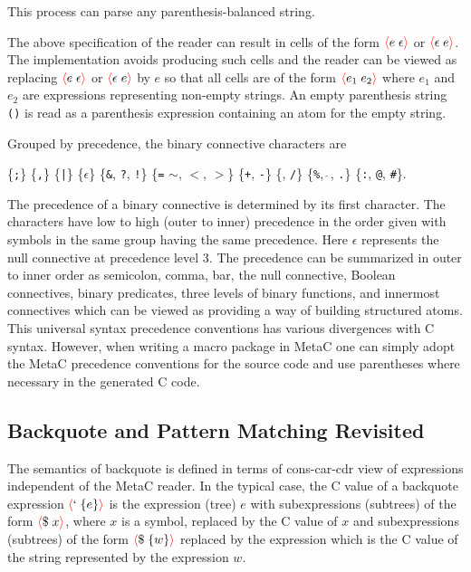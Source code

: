 \documentclass{article}
\newcommand{\mtt}[1]{\mbox{\tt #1}}
\newcommand{\fopen}{{\color{red} \langle}}
\newcommand{\fclose}{{\color{red} \rangle}}
\begin{document}
\noindent This process can parse any parenthesis-balanced string.

The above specification of the reader can result in cells of the form $\fopen e\;\epsilon \fclose$ or $\fopen \epsilon \;e\fclose$.   The implementation avoids producing such cells
and the reader can be viewed as replacing $\fopen e\;\epsilon \fclose$ or $\fopen \epsilon \;e\fclose$ by $e$ so that
all cells are of the form $\fopen e_1\;e_2\fclose$ where $e_1$ and $e_2$ are expressions representing non-empty strings.  An empty parenthesis string {\tt ()}
is read as a parenthesis expression containing an atom for the empty string.

\noindent Grouped by precedence, the binary connective characters are

\medskip
\centerline{\{\mtt{;}\} \{\mtt{,}\}  \{\mtt{|}\} \{$\epsilon$\}
  \{{\tt \&}, {\tt ?}, {\tt !}\} \{{\tt =} {\tt $\sim$}, {\tt $<$}, {\tt $>$}\} \{{\tt +}, {\tt -}\}
  \{{\tt *}, {\tt /}\} \{{\tt \%}, $\hat{~}$, {\tt .}\} \{\mtt{:},  {\tt @}, {\tt \#}\}.}

\noindent The precedence of a binary connective is determined by its first character.  The
characters have low to high (outer to inner) precedence in the order given with symbols in the same
group having the same precedence.  Here $\epsilon$ represents the null connective at precedence
level 3.  The precedence can be summarized in outer to inner order as semicolon, comma, bar, the
null connective, Boolean connectives, binary predicates, three levels of binary functions, and
innermost connectives which can be viewed as providing a way of building structured atoms.  This
universal syntax precedence conventions has
various divergences with C syntax.  However, when writing a macro package in MetaC one can simply
adopt the MetaC precedence conventions for the source code and use parentheses where necessary in
the generated C code.

\subsection{Backquote and Pattern Matching Revisited}

The semantics of backquote is defined in terms of cons-car-cdr view of expressions independent of the MetaC reader.
In the typical case, the C value of a backquote expression
$\fopen ` \;\{e\}\fclose$ is the expression (tree) $e$ with subexpressions (subtrees) of the form $\fopen \$\;x \fclose$, where $x$ is a symbol,
replaced by the C value of $x$
and subexpressions (subtrees) of the form $\fopen \$\;\{w\}\fclose$ replaced by the expression which is the C value of the string represented by the expression $w$.
\end{document}
